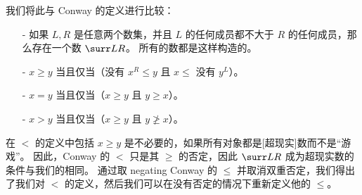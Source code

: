 \noindent
我们将此与 Conway 的定义进行比较：
\begin{itemize}\footnotesize
\item[-] 如果 $L,R$ 是任意两个数集，并且 $L$ 的任何成员都不大于 $R$ 的任何成员，那么存在一个数 $\surr L R$。
所有的数都是这样构造的。
\item[-] $x\ge y$ 当且仅当（没有 $x^R\le y$ 且 $x\le$ 没有 $y^L$）。
\item[-] $x=y$ 当且仅当（$x \ge y$ 且 $y\ge x$）。
\item[-] $x>y$ 当且仅当（$x\ge y$ 且 $y\not\ge x$）。
\end{itemize}
在 $<$ 的定义中包括 $x\ge y$ 是不必要的，如果所有对象都是[超现实]数而不是“游戏”。
因此，Conway 的 $<$ 只是其 $\ge$ 的否定，因此 $\surr L R$ 成为超现实数的条件与我们的相同。
通过取 negating Conway 的 $\le$ 并取消双重否定，我们得出了我们对 $<$ 的定义，然后我们可以在没有否定的情况下重新定义他的 $\le$。

